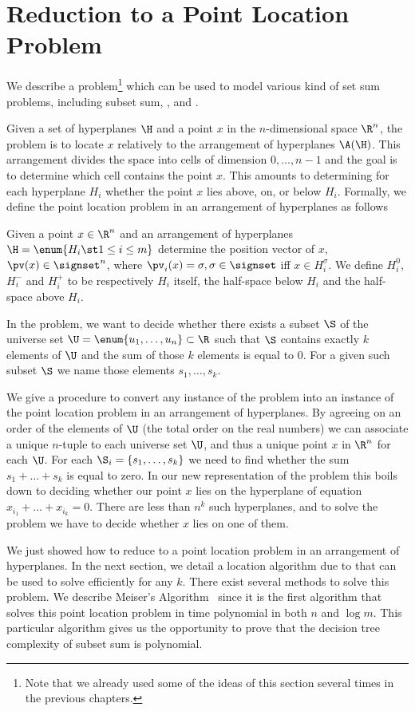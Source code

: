 \section{Reduction to a Point Location Problem}

We describe a problem\footnote{%
Note that we already used some of the ideas of this section several times in
the previous chapters.%
}
which can be used to model
various kind of set sum problems, including subset sum, \kSUM, and \kLDT.

Given a set of hyperplanes \(\H\) and a point \(x\) in the \(n\)-dimensional
space \(\R^n\), the problem is to locate \(x\) relatively
to the arrangement of hyperplanes \(\A(\H)\). This arrangement divides the space
into cells of dimension \(0,\ldots,n-1\) and the goal is to determine which
cell contains the point \(x\). This amounts to determining for each
hyperplane \(H_i\) whether the point \(x\) lies above, on, or below \(H_i\).
Formally, we define the point location problem in an arrangement of hyperplanes as
follows
\begin{problem}
Given a point $x \in \R^n$ and an arrangement of hyperplanes $\H = \enum{ H_i
\st 1 \leq i \leq m }$ determine the position vector of $x$, $\pv(x) \in
\signset^n$, where $\pv_i(x) = \sigma, \sigma \in \signset$ iff $x \in
H_i^{\sigma}$. We define $H_i^{0}$, $H_i^{-}$ and $H_i^{+}$ to be
respectively $H_i$ itself, the half-space below $H_i$ and the half-space above
$H_i$.
\end{problem}
In the \kSUM problem, we want to decide whether there exists a subset \(\S\) of the
universe set \(\U = \enum{u_1,\ldots,u_n} \subset \R\) such that
$\S$
contains exactly $k$ elements of $\U$ and the sum of those $k$
elements is equal to $0$. For a given such subset $\S$ we name those elements
$s_1, \dots, s_k$.

We give a procedure to convert any instance of the \kSUM problem into an
instance of the point location problem in an arrangement of hyperplanes.
By agreeing on an order of the elements of $\U$ (\eg the total order on
the real numbers) we can associate a unique $n$-tuple to each universe set $\U$,
and thus a unique point $x$ in $\R^n$ for each $\U$.
For each $\S_i = \left\{s_1, \dots, s_k\right\}$ we need to find whether the sum $s_1
+ \dots + s_k$ is equal to zero. In our new representation of the problem this
boils down to deciding whether our point $x$ lies on the hyperplane of
equation $x_{i_1} + \dots + x_{i_k} = 0$. There are less than $n^k$ such
hyperplanes, and to solve the problem
we have to decide whether \(x\) lies on one of them.

We just showed how to reduce \kSUM to a
point location problem in an arrangement of hyperplanes. In the next section,
we detail a location algorithm due to \citet*{meiser:1993} that can be used to
solve \kSUM efficiently for any $k$. There exist several methods to solve
this problem. We describe Meiser's Algorithm~\cite{meiser:1993} since it
is the first algorithm that solves this point location problem in time
polynomial in both $n$ and $\log m$. This particular
algorithm gives us the opportunity to prove that the decision tree complexity
of subset sum is polynomial.


